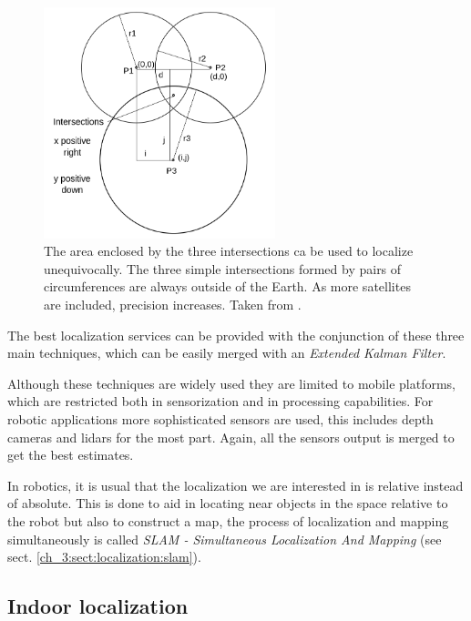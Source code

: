       \begin{figure}[!h]
        \centering
        \includegraphics[width=0.6\textwidth]{./Figures/trilateration.png}
        \caption{The area enclosed by the three intersections ca be used to localize unequivocally. The three simple intersections formed by pairs of circumferences are always outside of the Earth. As more satellites are included, precision increases. Taken from \cite{wikipedia_trilateration_web}.}
        \label{ch_3:fig:trilateration}
      \end{figure}

      The best localization services can be provided with the conjunction of these three main techniques, which can be easily merged with an \textit{Extended Kalman Filter}.

      Although these techniques are widely used they are limited to mobile platforms, which are restricted both in sensorization and in processing capabilities. For robotic applications more sophisticated sensors are used, this includes depth cameras and lidars for the most part. Again, all the sensors output is merged to get the best estimates.

      In robotics, it is usual that the localization we are interested in is relative instead of absolute. This is done to aid in locating near objects in the space relative to the robot but also to construct a map, the process of localization and mapping simultaneously is called \textit{SLAM - Simultaneous Localization And Mapping} (see sect. \ref{ch_3:sect:localization:slam}).

    \subsection{Indoor localization} \label{ch_3:sect:localization:indoor}

